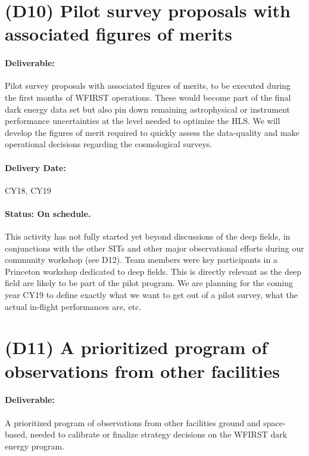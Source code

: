 

\section*{(D10) Pilot survey proposals with associated figures of merits}

\paragraph*{Deliverable:} Pilot survey proposals with associated figures of merits, to be executed during the first months of WFIRST operations. These would become
part of the final dark energy data set but also pin down remaining astrophysical
or instrument performance uncertainties at the level needed to optimize the HLS.
We will develop the figures of merit required to quickly assess the data-quality
and make operational decisions regarding the cosmological surveys.

\paragraph*{Delivery Date:} CY18, CY19

\paragraph*{Status: On schedule.} This activity has not fully started yet beyond discussions of the deep fields, in conjunctions with the other SITs and other major observational efforts during our community workshop (see D12). Team members were key participants in a Princeton workshop dedicated to deep fields. This is directly relevant as the deep field are likely to be part of the pilot program. We are planning for the coming year CY19 to define exactly what we want to get out of a pilot survey, what the actual in-flight performances are, etc.

\section*{(D11) A prioritized program of observations from other facilities}

\paragraph*{Deliverable:} A prioritized program of observations from other facilities
ground and space-based, needed to calibrate or finalize strategy decisions on
the WFIRST dark energy program.

